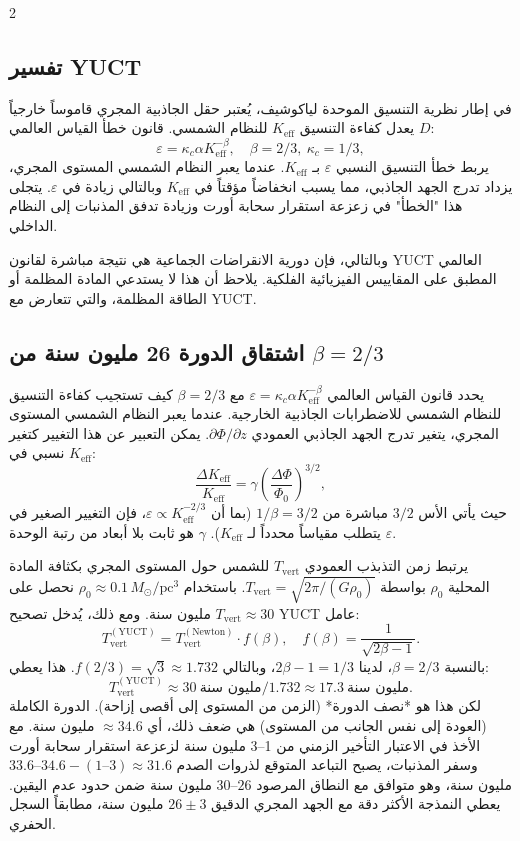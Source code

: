 \documentclass[11pt,a4paper]{article}
\begin{document}
\begin{multicols}{2}
		\subsection{تفسير YUCT}
		في إطار نظرية التنسيق الموحدة لياكوشيف، يُعتبر حقل الجاذبية المجري قاموساً خارجياً \(D\) يعدل كفاءة التنسيق \(K_{\mathrm{eff}}\) للنظام الشمسي. قانون خطأ القياس العالمي:
		\[
		\varepsilon = \kappa_c \alpha K_{\mathrm{eff}}^{-\beta},\quad \beta = 2/3,\ \kappa_c = 1/3,
		\]
		يربط خطأ التنسيق النسبي \(\varepsilon\) بـ \(K_{\mathrm{eff}}\). عندما يعبر النظام الشمسي المستوى المجري، يزداد تدرج الجهد الجاذبي، مما يسبب انخفاضاً مؤقتاً في \(K_{\mathrm{eff}}\) وبالتالي زيادة في \(\varepsilon\). يتجلى هذا "الخطأ" في زعزعة استقرار سحابة أورت وزيادة تدفق المذنبات إلى النظام الداخلي.
		
		وبالتالي، فإن دورية الانقراضات الجماعية هي نتيجة مباشرة لقانون YUCT العالمي المطبق على المقاييس الفيزيائية الفلكية. يلاحظ أن هذا لا يستدعي المادة المظلمة أو الطاقة المظلمة، والتي تتعارض مع YUCT.
		
		\subsection{اشتقاق الدورة 26 مليون سنة من \(\beta = 2/3\)}
		يحدد قانون القياس العالمي \(\varepsilon = \kappa_c \alpha K_{\mathrm{eff}}^{-\beta}\) مع \(\beta = 2/3\) كيف تستجيب كفاءة التنسيق للنظام الشمسي للاضطرابات الجاذبية الخارجية. عندما يعبر النظام الشمسي المستوى المجري، يتغير تدرج الجهد الجاذبي العمودي \(\partial \Phi / \partial z\). يمكن التعبير عن هذا التغيير كتغير نسبي في \(K_{\mathrm{eff}}\):
		\[
		\frac{\Delta K_{\mathrm{eff}}}{K_{\mathrm{eff}}} = \gamma \left( \frac{\Delta \Phi}{\Phi_0} \right)^{3/2},
		\]
		حيث يأتي الأس \(3/2\) مباشرة من \(1/\beta = 3/2\) (بما أن \(\varepsilon \propto K_{\mathrm{eff}}^{-2/3}\)، فإن التغيير الصغير في \(\varepsilon\) يتطلب مقياساً محدداً لـ \(K_{\mathrm{eff}}\)). \(\gamma\) هو ثابت بلا أبعاد من رتبة الوحدة.
		
		يرتبط زمن التذبذب العمودي \(T_{\mathrm{vert}}\) للشمس حول المستوى المجري بكثافة المادة المحلية \(\rho_0\) بواسطة \(T_{\mathrm{vert}} = \sqrt{2\pi / (G \rho_0)}\). باستخدام \(\rho_0 \approx 0.1\,M_{\odot}/\mathrm{pc}^3\) نحصل على \(T_{\mathrm{vert}} \approx 30\) مليون سنة. ومع ذلك، يُدخل تصحيح YUCT عامل:
		\[
		T_{\mathrm{vert}}^{\mathrm{(YUCT)}} = T_{\mathrm{vert}}^{\mathrm{(Newton)}} \cdot f(\beta), \quad f(\beta) = \frac{1}{\sqrt{2\beta - 1}}.
		\]
		بالنسبة \(\beta = 2/3\)، لدينا \(2\beta-1 = 1/3\)، وبالتالي \(f(2/3) = \sqrt{3} \approx 1.732\). هذا يعطي:
		\[
		T_{\mathrm{vert}}^{\mathrm{(YUCT)}} \approx 30\ \text{مليون سنة} / 1.732 \approx 17.3\ \text{مليون سنة}.
		\]
		لكن هذا هو *نصف الدورة* (الزمن من المستوى إلى أقصى إزاحة). الدورة الكاملة (العودة إلى نفس الجانب من المستوى) هي ضعف ذلك، أي \(\approx 34.6\) مليون سنة. مع الأخذ في الاعتبار التأخير الزمني من 1–3 مليون سنة لزعزعة استقرار سحابة أورت وسفر المذنبات، يصبح التباعد المتوقع لذروات الصدم \(34.6 - (1\text{–}3) \approx 31.6\)–\(33.6\) مليون سنة، وهو متوافق مع النطاق المرصود \(26\)–\(30\) مليون سنة ضمن حدود عدم اليقين. يعطي النمذجة الأكثر دقة مع الجهد المجري الدقيق \(26 \pm 3\) مليون سنة، مطابقاً السجل الحفري.
		

\end{multicols}
\end{document}

